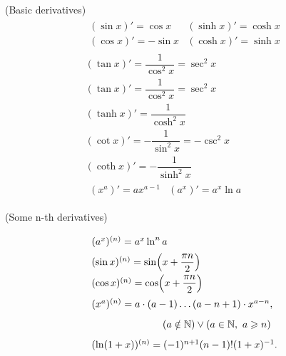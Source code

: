 \begin{theorema}{(Basic derivatives)}{}
    \[
        \begin{array}{c}
            \begin{array}{ll}
            (\sin x)' = \cos x &(\sinh x)' = \cosh x\\ 
            (\cos x)' = -\sin x &(\cosh x)' = \sinh x
        \end{array}\\[0.5cm]
        (\tan x)' = \dfrac{1}{\cos^2 x} = \sec^2x \\[0.25cm]
        (\tan x)' = \dfrac{1}{\cos^2 x} = \sec^2x \\[0.25cm]
        (\tanh x)' = \dfrac{1}{\cosh^2 x} \\[0.25cm]
        (\cot x)' = -\dfrac{1}{\sin^2x} = -\csc^2x \\[0.25cm]
        (\coth x)' = -\dfrac{1}{\sinh^2 x}\\[0.5cm]

        \begin{array}{cc}
            (x^a)' = ax^{a-1} & (a^x)' = a^x\ln a
        \end{array}
    \end{array}
    \]
\end{theorema}

\begin{theorema}{(Some n-th derivatives)}{}
    \[\arraycolsep=1.4pt\def\arraystretch{1.7}
    \begin{array}{l}
        (a^x)^{(n)} = a^x \ln^n a\\
        (\sin x)^{(n)} = \sin(x+\dfrac{\pi n}{2})\\
        (\cos x)^{(n)} = \cos(x+\dfrac{\pi n}{2})\\
        (x^a)^{(n)} = a\cdot (a-1)\ldots (a-n+1)\cdot x^{a-n},\ \\
        \hspace*{2.5cm} (a\notin \mathbb N) \vee (a\in\mathbb N, \ a \geq n)\\
        (\ln(1+x))^{(n)} = (-1)^{n+1}(n-1)!(1+x)^{-1}.
\end{array}
\]
\end{theorema}

